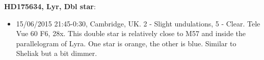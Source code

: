 {\bf HD175634, Lyr, Dbl star}:
\begin{itemize}
\item 15/06/2015 21:45-0:30, Cambridge, UK. 2 - Slight undulations, 5 - Clear. Tele Vue 60 F6, 28x. This double star is relatively close to M57 and inside the parallelogram of Lyra. One star is orange, the other is blue. Similar to Sheliak but a bit dimmer.
\end{itemize}
